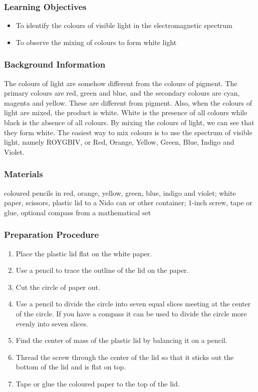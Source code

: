 \subsubsection*{Learning Objectives}
\begin{itemize}
\item{To identify the colours of visible light in the electromagnetic spectrum} 
\item{To observe the mixing of colours to form white light} 
\end{itemize}

\subsubsection*{Background Information}
The colours of light are somehow different from the colours of pigment. The primary colours are red, green and blue, and the secondary colours are cyan, magenta and yellow. These are different from pigment. Also, when the colours of light are mixed, the product is white. White is the presence of all colours while black is the absence of all colours.  
By mixing the colours of light, we can see that they form white. The easiest way to mix colours is to use the spectrum of visible light, namely ROYGBIV, or Red, Orange, Yellow, Green, Blue, Indigo and Violet.  

\subsubsection*{Materials}
coloured pencils in red, orange, yellow, green, blue, indigo and violet; white paper, scissors, plastic lid to a Nido can or other container; 1-inch screw, tape or glue, optional compass from a mathematical set

\subsubsection*{Preparation Procedure}
\begin{enumerate}
\item{Place the plastic lid flat on the white paper.} 
\item{Use a pencil to trace the outline of the lid on the paper.} 
\item{Cut the circle of paper out.} 
\item{Use a pencil to divide the circle into seven equal slices meeting at the center of the circle.  If you have a compass it can be used to divide the circle more evenly into seven slices.} 
\item{Find the center of mass of the plastic lid by balancing it on a pencil.} 
\item{Thread the screw through the center of the lid so that it sticks out the bottom of the lid and is flat on top.} 
\item{Tape or glue the coloured paper to the top of the lid.} 
\end{enumerate}

